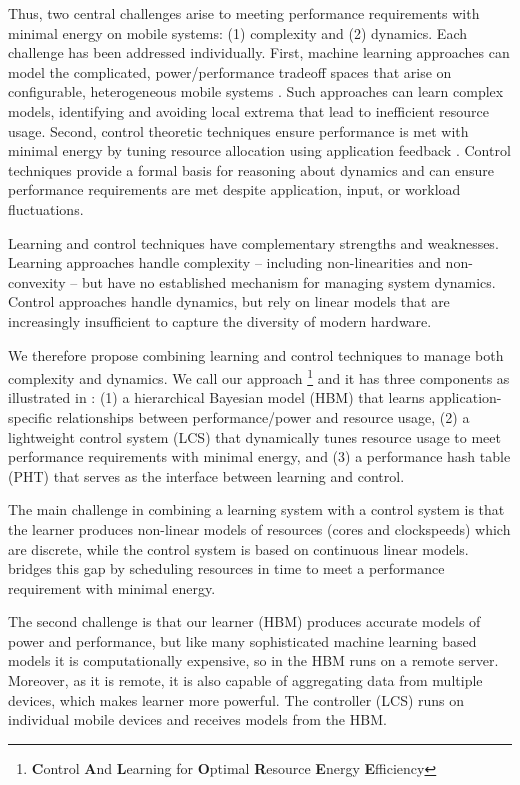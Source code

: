Thus, two central challenges arise to meeting performance requirements
with minimal energy on mobile systems: (1) complexity and (2)
dynamics.  Each challenge has been addressed individually.  First,
machine learning approaches can model the complicated,
power/performance tradeoff spaces that arise on configurable,
heterogeneous mobile systems
\cite{dubach2010,Bitirgen2008,Ipek,Koala,LEO,Flicker,Ponamarev}.  Such
approaches can learn complex models, identifying and avoiding local
extrema that lead to inefficient resource usage.  Second, control
theoretic techniques ensure performance is met with minimal energy by
tuning resource allocation using application feedback
\cite{Wu2004,Chen2011,PTRADE,POET,ControlWare,Agilos,grace2}.  Control
techniques provide a formal basis for reasoning about dynamics and can
ensure performance requirements are met despite application, input, or
workload fluctuations.

Learning and control techniques have complementary strengths and
weaknesses.  Learning approaches handle complexity -- including
non-linearities and non-convexity -- but have no established mechanism
for managing system dynamics.  Control approaches handle dynamics, but
rely on linear models that are increasingly insufficient to capture
the diversity of modern hardware.

We therefore propose combining learning and control techniques to
manage both complexity and dynamics.  We call our approach
\SYSTEM{}\footnote{\textbf{C}ontrol \textbf{A}nd \textbf{L}earning for
  \textbf{O}ptimal \textbf{R}esource \textbf{E}nergy
  \textbf{E}fficiency} and it has three components as illustrated in
: (1) a hierarchical Bayesian model (HBM) that learns
application-specific relationships between performance/power and
resource usage, (2) a lightweight control system (LCS) that
dynamically tunes resource usage to meet performance requirements with
minimal energy, and (3) a performance hash table (PHT) that serves as
the interface between learning and control.  

The main challenge in combining a learning system with a control system is that the learner produces non-linear models of
resources (\eg cores and clockspeeds) which are discrete, while the control
system is based on continuous linear models.  \SYSTEM{} bridges this
gap by scheduling resources in time to meet a performance requirement
with minimal energy.  

The second challenge is that our learner (HBM) produces accurate
models of power and performance, but like many sophisticated machine learning based models it is computationally expensive,
so in \SYSTEM{} the HBM runs on a remote server.  Moreover, as it is remote, it
is also capable of aggregating data from multiple devices, which makes learner more powerful. The controller (LCS) runs on individual mobile devices and receives models from the HBM.

